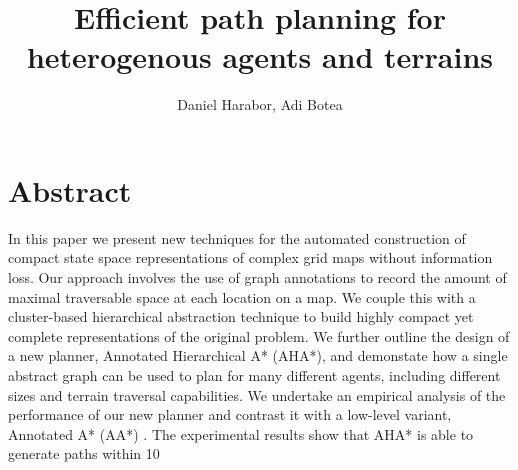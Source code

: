 \documentclass[a4paper]{article}
\begin{document}
\title{Efficient path planning for heterogenous agents and terrains}

\author{Daniel Harabor, Adi Botea}

\maketitle

\section{Abstract}
In this paper we present new techniques for the automated construction of compact state space representations of complex grid maps without information loss. Our approach involves the use of graph annotations to record the amount of maximal traversable space at each location on a map. We couple this with a cluster-based hierarchical abstraction technique to build highly compact yet complete representations of the original problem. We further outline the design of a new planner, Annotated Hierarchical A* (AHA*), and demonstate how a single abstract graph can be used to plan for many different agents, including different sizes and terrain traversal capabilities. 
We undertake an empirical analysis of the performance of our new planner and contrast it with a low-level variant, Annotated A* (AA*) . The experimental results show that AHA* is able to generate paths within 10%
\end{document}
